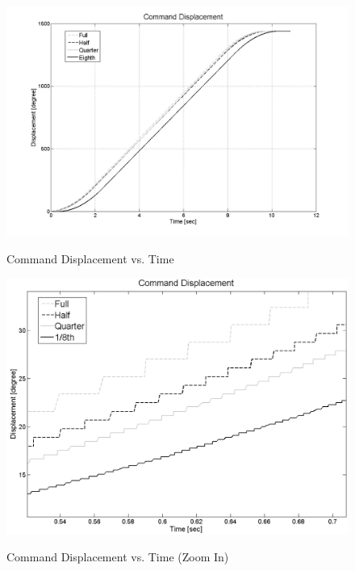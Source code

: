 \documentclass{article}
\theoremstyle{plain}
\theoremstyle{definition}
\theoremstyle{remark}
\begin{document}
\begin{figure}[hbt]
\begin{center}
\includegraphics[width=12cm]{Q4_CommandPosition.png}
\caption{Command Displacement vs. Time} \label{tex}
\label{fig:q4_7}
\end{center}
\end{figure}

\begin{figure}[hbt]
\begin{center}
\includegraphics[width=12cm]{Q4_CommandPosition_L.png}
\caption{Command Displacement vs. Time (Zoom In)} \label{tex}
\label{fig:q4_8}
\end{center}
\end{figure}
\end{document}
